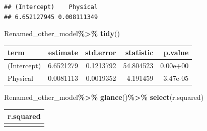 \documentclass[
  11pt,
]{article}
\newenvironment{Shaded}{\begin{snugshade}}{\end{snugshade}}
\newcommand{\AttributeTok}[1]{\textcolor[rgb]{0.13,0.29,0.53}{#1}}
\newcommand{\DecValTok}[1]{\textcolor[rgb]{0.00,0.00,0.81}{#1}}
\newcommand{\FunctionTok}[1]{\textcolor[rgb]{0.13,0.29,0.53}{\textbf{#1}}}
\newcommand{\NormalTok}[1]{#1}
\newcommand{\SpecialCharTok}[1]{\textcolor[rgb]{0.81,0.36,0.00}{\textbf{#1}}}
\newcommand{\StringTok}[1]{\textcolor[rgb]{0.31,0.60,0.02}{#1}}
\begin{document}
\begin{verbatim}
## (Intercept)    Physical 
## 6.652127945 0.008111349
\end{verbatim}

\begin{Shaded}
\begin{Highlighting}[]
\NormalTok{Renamed\_other\_model}\SpecialCharTok{\%\textgreater{}\%}
  \FunctionTok{tidy}\NormalTok{()}
\end{Highlighting}
\end{Shaded}

\begin{longtable}[]{@{}lrrrr@{}}
\toprule\noalign{}
term & estimate & std.error & statistic & p.value \\
\midrule\noalign{}
\endhead
\bottomrule\noalign{}
\endlastfoot
(Intercept) & 6.6521279 & 0.1213792 & 54.804523 & 0.00e+00 \\
Physical & 0.0081113 & 0.0019352 & 4.191459 & 3.47e-05 \\
\end{longtable}

\begin{Shaded}
\begin{Highlighting}[]
\NormalTok{Renamed\_other\_model}\SpecialCharTok{\%\textgreater{}\%}
  \FunctionTok{glance}\NormalTok{()}\SpecialCharTok{\%\textgreater{}\%}
  \FunctionTok{select}\NormalTok{(r.squared)}
\end{Highlighting}
\end{Shaded}

\begin{longtable}[]{@{}r@{}}
\toprule\noalign{}
r.squared \\
\midrule\noalign{}
\endhead
\bottomrule\noalign{}
\endlastfoot
0.0450969 \\
\end{longtable}

\begin{Shaded}
\end{Shaded}
\end{document}
